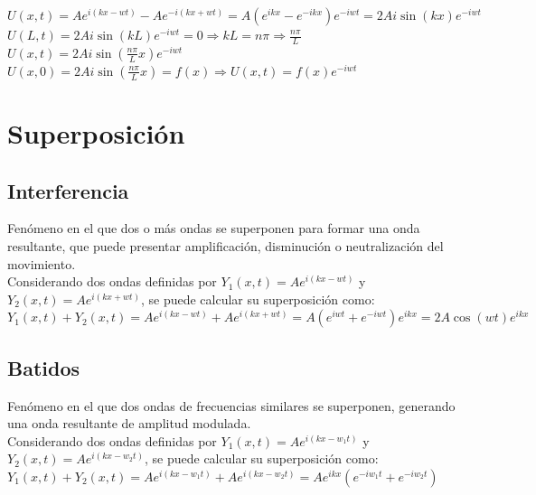 \documentclass[oneside]{book}
\numberwithin{equation}{section}
\numberwithin{figure}{section}
\numberwithin{table}{section}
\begin{document}
				$\displaystyle U(x,t)=Ae^{i(kx-wt)}-Ae^{-i(kx+wt)}=A(e^{ikx}-e^{-ikx})e^{-iwt}=2Ai\sin (kx)e^{-iwt}$\\
				
				$\displaystyle U(L,t)=2Ai\sin (kL)e^{-iwt}=0 \Rightarrow kL=n\pi \Rightarrow \frac{n\pi}{L} $\\
				
				$\displaystyle U(x,t)=2Ai\sin (\frac{n\pi}{L}x)e^{-iwt}$\\
				
				$\displaystyle U(x,0)=2Ai\sin (\frac{n\pi}{L}x)=f(x) \Rightarrow U(x,t)=f(x)e^{-iwt}$\\			
							
		\section{Superposición}
			\subsection{Interferencia}
			
			Fenómeno en el que dos o más ondas se superponen para formar una onda resultante, que puede presentar amplificación, disminución o neutralización del movimiento.\\
			
			Considerando dos ondas definidas por $\displaystyle Y_1(x,t)=Ae^{i(kx-wt)}$ y $\displaystyle Y_2(x,t)=Ae^{i(kx+wt)}$, se puede calcular su superposición como:\\
			
			$\displaystyle Y_1(x,t)+Y_2(x,t)=Ae^{i(kx-wt)}+Ae^{i(kx+wt)}=A(e^{iwt}+e^{-iwt})e^{ikx}=2A\cos (wt)e^{ikx}$\\
						
			\subsection{Batidos}
			
			Fenómeno en el que dos ondas de frecuencias similares se superponen, generando una onda resultante de amplitud modulada.\\
			
			Considerando dos ondas definidas por $\displaystyle Y_1(x,t)=Ae^{i(kx-w_1t)}$ y $\displaystyle Y_2(x,t)=Ae^{i(kx-w_2t)}$, se puede calcular su superposición como:\\
			
			$\displaystyle Y_1(x,t)+Y_2(x,t)=Ae^{i(kx-w_1t)}+Ae^{i(kx-w_2t)}=Ae^{ikx}(e^{-iw_1t}+e^{-iw_2t})$\\
			
\end{document}

